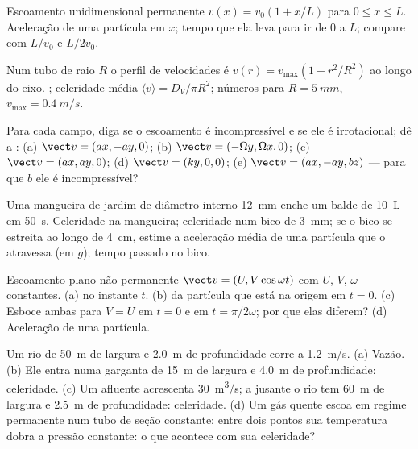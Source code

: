 \begin{exercise}[$\star$]\label{exo:b2:fluid-kinematics:2}
Escoamento unidimensional permanente $v(x) = v_0(1 + x/L)$ para $0 \le x \le L$.
Aceleração de uma partícula em $x$; tempo que ela leva para ir de $0$ a
$L$; compare com $L/v_0$ e $L/2v_0$.
\end{exercise}

\begin{exercise}[$\star$]\label{exo:b2:fluid-kinematics:3}
Num tubo de raio $R$ o perfil de velocidades é $v(r) = v_{\max}(1 -
r^2/R^2)$ ao longo do eixo. ; celeridade média $\langle v\rangle
= D_V/\pi R^2$; números para $R = \qty{5}{mm}$, $v_{\max} = \qty{0.4}{m/s}$.
\end{exercise}

\begin{exercise}[$\star$]\label{exo:b2:fluid-kinematics:4}
Para cada campo, diga se o escoamento é incompressível e se ele
é irrotacional; dê a : (a) $\vect v = (ax, -ay, 0)$; (b)
$\vect v = (-\Omega y, \Omega x, 0)$; (c) $\vect v = (ax, ay, 0)$; (d) $\vect v =
(ky, 0, 0)$; (e) $\vect v = (ax, -ay, bz)$ --- para que $b$ ele é
incompressível?
\end{exercise}

\begin{exercise}[$\star\star$]\label{exo:b2:fluid-kinematics:5}
Uma mangueira de jardim de diâmetro interno \qty{12}{mm} enche um balde de \qty{10}{L} em
\qty{50}{s}. Celeridade na mangueira; celeridade num bico de \qty{3}{mm}; se o
bico se estreita ao longo de \qty{4}{cm}, estime a aceleração média de uma
partícula que o atravessa (em $g$); tempo passado no bico.
\end{exercise}

\begin{exercise}[$\star\star$]\label{exo:b2:fluid-kinematics:6}
Escoamento plano não permanente $\vect v = (U, V\cos\omega t)$ com $U$, $V$, $\omega$
constantes. (a)  no instante $t$. (b)  da partícula que está
na origem em $t = 0$. (c) Esboce ambas para $V = U$ em $t = 0$ e em
$t = \pi/2\omega$; por que elas diferem? (d) Aceleração de uma partícula.
\end{exercise}

\begin{exercise}[$\star\star$]\label{exo:b2:fluid-kinematics:7}
Um rio de \qty{50}{m} de largura e \qty{2.0}{m} de profundidade corre a \qty{1.2}{m/s}. (a)
Vazão. (b) Ele entra numa garganta de \qty{15}{m} de largura e \qty{4.0}{m} de profundidade:
celeridade. (c) Um afluente acrescenta \qty{30}{m^3/s}; a jusante o rio tem
\qty{60}{m} de largura e \qty{2.5}{m} de profundidade: celeridade. (d) Um gás quente escoa em regime permanente
num tubo de seção constante; entre dois pontos sua temperatura
dobra a pressão constante: o que acontece com sua celeridade?
\end{exercise}

